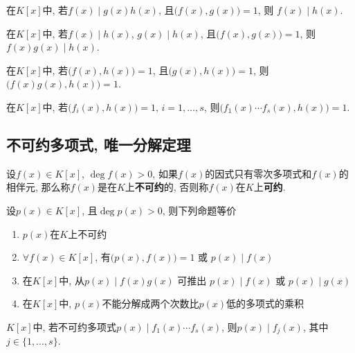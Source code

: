 \begin{Property}[!]
在$K[x]$中, 若$f(x) \mid g(x) h(x)$, 且$\Big( f(x), g(x) \Big) = 1$, 则 $f(x) \mid h(x)$.
\end{Property}

\begin{Property}[!]
在$K[x]$中, 若$f(x) \mid h(x)$, $g(x) \mid h(x)$, 且$\Big( f(x), g(x) \Big) = 1$, 则$f(x) g(x) \mid h(x)$.
\end{Property}

\begin{Property}
在$K[x]$中, 若$\Big( f(x), h(x) \Big) = 1$, 且$\Big( g(x), h(x) \Big) = 1$, 则$\Big( f(x) g(x), h(x) \Big) = 1$.
\end{Property}

\begin{Corollary}
在$K[x]$中, 若$\Big( f_i(x), h(x) \Big) = 1$, $i = 1, \dots, s$, 则$\Big( f_1(x)\cdots f_s(x), h(x) \Big) = 1$.
\end{Corollary}

\subsection{不可约多项式, 唯一分解定理}

\begin{Definition}
设$f(x) \in K[x]$, $\deg f(x) > 0$, 如果$f(x)$的因式只有零次多项式和$f(x)$的相伴元, 那么称$f(x)$是在$K$上\textbf{不可约}的, 否则称$f(x)$在$K$上\textbf{可约}.
\end{Definition}

\begin{Theorem}
设$p(x) \in K[x]$, 且$\deg p(x) > 0$, 则下列命题等价
\begin{enumerate}[(1)]
\item $p(x)$在$K$上不可约
\item $\forall f(x) \in K[x]$, 有$\Big( p(x), f(x) \Big) = 1$ 或 $p(x) \mid f(x)$
\item 在$K[x]$中, 从$p(x) \mid f(x) g(x)$ 可推出 $p(x) \mid f(x)$ 或 $p(x) \mid g(x)$
\item 在$K[x]$中, $p(x)$不能分解成两个次数比$p(x)$低的多项式的乘积
\end{enumerate}
\end{Theorem}

\begin{Corollary}
$K[x]$中, 若不可约多项式$p(x) \mid f_1(x) \cdots f_s(x)$, 则$p(x) \mid f_j(x)$, 其中$j \in \{ 1, \dots, s \}$.
\end{Corollary}

